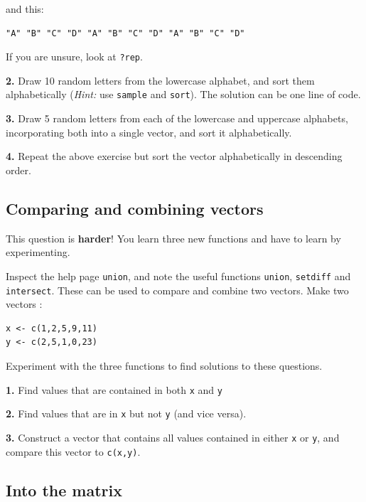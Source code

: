 \documentclass[]{book}
\begin{document}
and this:

\begin{verbatim}
"A" "B" "C" "D" "A" "B" "C" "D" "A" "B" "C" "D"
\end{verbatim}

If you are unsure, look at \texttt{?rep}.

\textbf{2.} Draw 10 random letters from the lowercase alphabet, and sort them alphabetically (\emph{Hint:} use \texttt{sample} and \texttt{sort}). The solution can be one line of code.

\textbf{3.} Draw 5 random letters from each of the lowercase and uppercase alphabets, incorporating both into a single vector, and sort it alphabetically.

\textbf{4.} Repeat the above exercise but sort the vector alphabetically in descending order.

\hypertarget{comparing-and-combining-vectors}{%
\subsection{Comparing and combining vectors}\label{comparing-and-combining-vectors}}

This question is \textbf{harder}! You learn three new functions and have to learn by experimenting.

Inspect the help page \texttt{union}, and note the useful functions \texttt{union}, \texttt{setdiff} and \texttt{intersect}. These can be used to compare and combine two vectors. Make two vectors :

\begin{verbatim}
x <- c(1,2,5,9,11)
y <- c(2,5,1,0,23)
\end{verbatim}

Experiment with the three functions to find solutions to these questions.

\textbf{1.} Find values that are contained in both \texttt{x} and \texttt{y}

\textbf{2.} Find values that are in \texttt{x} but not \texttt{y} (and vice versa).

\textbf{3.} Construct a vector that contains all values contained in either \texttt{x} or \texttt{y}, and compare this vector to \texttt{c(x,y)}.

\hypertarget{into-the-matrix}{%
\subsection{Into the matrix}\label{into-the-matrix}}
\end{document}
